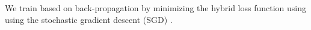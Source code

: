 We train \TRANPCNN based on back-propagation by minimizing the hybrid loss function using using the stochastic gradient descent (SGD) \cite{duchi2011adaptive}.





